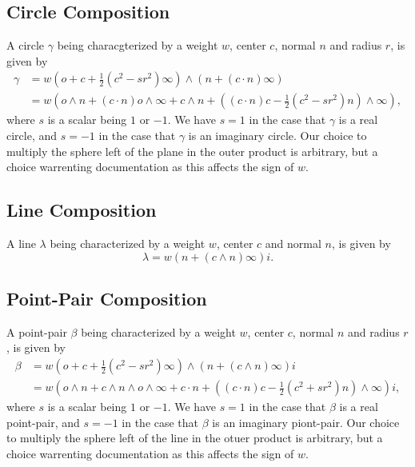 \documentclass[12pt]{article}
\newcommand{\nvao}{o}
\newcommand{\nvai}{\infty}
\begin{document}
\subsection{Circle Composition}

A circle $\gamma$ being characgterized by a weight $w$, center $c$, normal $n$
and radius $r$, is given by
\begin{align}\label{equ_circle}
\gamma &=w\left(\nvao+c+\frac{1}{2}(c^2-sr^2)\nvai\right)\wedge(n+(c\cdot n)\nvai) \\
 &= w\left(\nvao\wedge n+(c\cdot n)\nvao\wedge\nvai+c\wedge n+
\left((c\cdot n)c - \frac{1}{2}(c^2-sr^2)n\right)\wedge\nvai\right),
\end{align}
where $s$ is a scalar being $1$ or $-1$.  We have $s=1$ in the
case that $\gamma$ is a real circle, and $s=-1$ in the case that
$\gamma$ is an imaginary circle.  Our choice to multiply the sphere
left of the plane in the outer product is arbitrary, but a choice
warrenting documentation as this affects the sign of $w$.

\subsection{Line Composition}

A line $\lambda$ being characterized by a weight $w$, center $c$ and normal $n$, is
given by
\begin{equation}\label{equ_line}
\lambda = w\left(n + (c\wedge n)\nvai\right)i.
\end{equation}

\subsection{Point-Pair Composition}

A point-pair $\beta$ being characterized by a weight $w$, center $c$, normal $n$
and radius $r$, is given by
\begin{align}\label{equ_piontpair}
\beta &= w\left(\nvao + c + \frac{1}{2}(c^2-sr^2)\nvai\right)\wedge(n+(c\wedge n)\nvai)i \\
 &= w\left(\nvao\wedge n+c\wedge n\wedge\nvao\wedge\nvai + c\cdot n +
\left((c\cdot n)c-\frac{1}{2}(c^2+sr^2)n\right)\wedge\nvai\right)i,
\end{align}
where $s$ is a scalar being $1$ or $-1$.  We have $s=1$ in the case
that $\beta$ is a real point-pair, and $s=-1$ in the case that $\beta$ is an imaginary piont-pair.
Our choice to multiply the sphere left of the line in the otuer product is arbitrary, but a
choice warrenting documentation as this affects the sign of $w$.
\end{document}
